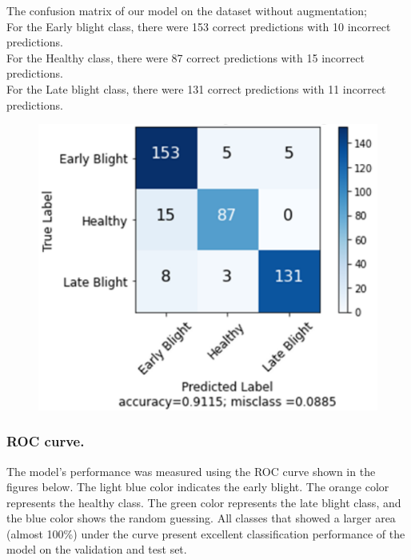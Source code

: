 \documentclass[11pt]{report}
\begin{document}
The confusion matrix of our model on the dataset without augmentation;\\
For the Early blight class, there were 153 correct predictions with 10 incorrect predictions.\\
For the Healthy class, there were 87 correct predictions with 15 incorrect predictions.\\
For the Late blight class, there were 131 correct predictions with 11 incorrect predictions.\\
\begin{figure}[h]
	\centerline{\small 
		\includegraphics[height=0.25\textheight]  {p8}}
\end{figure}

\newpage
\subsubsection*{ROC curve.}
The model’s performance was measured using the ROC curve shown in the figures below. The light blue color indicates the early blight. The orange color represents
the healthy class. The green color represents the late blight class, and the blue color
shows the random guessing. All classes that showed a larger area (almost 100\%) under the curve present excellent classification performance of the model on the validation
and test set.\\
\end{document}
